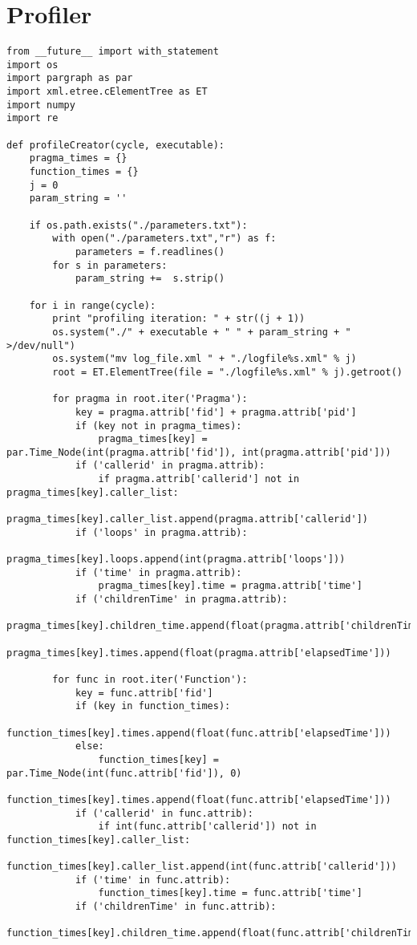 \documentclass[a4paper,10pt,twoside]{book}
\begin{document}
\section{Profiler}
\begin{lstlisting}[language=CCC, caption=profiler.py]
from __future__ import with_statement
import os
import pargraph as par
import xml.etree.cElementTree as ET
import numpy 
import re

def profileCreator(cycle, executable):
	pragma_times = {}
	function_times = {}
	j = 0
	param_string = ''

	if os.path.exists("./parameters.txt"):
		with open("./parameters.txt","r") as f:
			parameters = f.readlines()
		for s in parameters:
			param_string +=  s.strip()

	for i in range(cycle):
		print "profiling iteration: " + str((j + 1))
		os.system("./" + executable + " " + param_string + " >/dev/null")	
		os.system("mv log_file.xml " + "./logfile%s.xml" % j)
		root = ET.ElementTree(file = "./logfile%s.xml" % j).getroot()

		for pragma in root.iter('Pragma'):
			key = pragma.attrib['fid'] + pragma.attrib['pid']
			if (key not in pragma_times):
				pragma_times[key] = par.Time_Node(int(pragma.attrib['fid']), int(pragma.attrib['pid']))
			if ('callerid' in pragma.attrib):
				if pragma.attrib['callerid'] not in pragma_times[key].caller_list:
					pragma_times[key].caller_list.append(pragma.attrib['callerid'])
			if ('loops' in pragma.attrib):
				pragma_times[key].loops.append(int(pragma.attrib['loops']))
			if ('time' in pragma.attrib):
				pragma_times[key].time = pragma.attrib['time']
			if ('childrenTime' in pragma.attrib):
				pragma_times[key].children_time.append(float(pragma.attrib['childrenTime']))
			pragma_times[key].times.append(float(pragma.attrib['elapsedTime']))

		for func in root.iter('Function'):
			key = func.attrib['fid']
			if (key in function_times):
				function_times[key].times.append(float(func.attrib['elapsedTime']))
			else:
				function_times[key] = par.Time_Node(int(func.attrib['fid']), 0)
				function_times[key].times.append(float(func.attrib['elapsedTime']))
			if ('callerid' in func.attrib):
				if int(func.attrib['callerid']) not in function_times[key].caller_list:
					function_times[key].caller_list.append(int(func.attrib['callerid']))
			if ('time' in func.attrib):
				function_times[key].time = func.attrib['time']
			if ('childrenTime' in func.attrib):
				function_times[key].children_time.append(float(func.attrib['childrenTime']))


\end{lstlisting}
\end{document}
